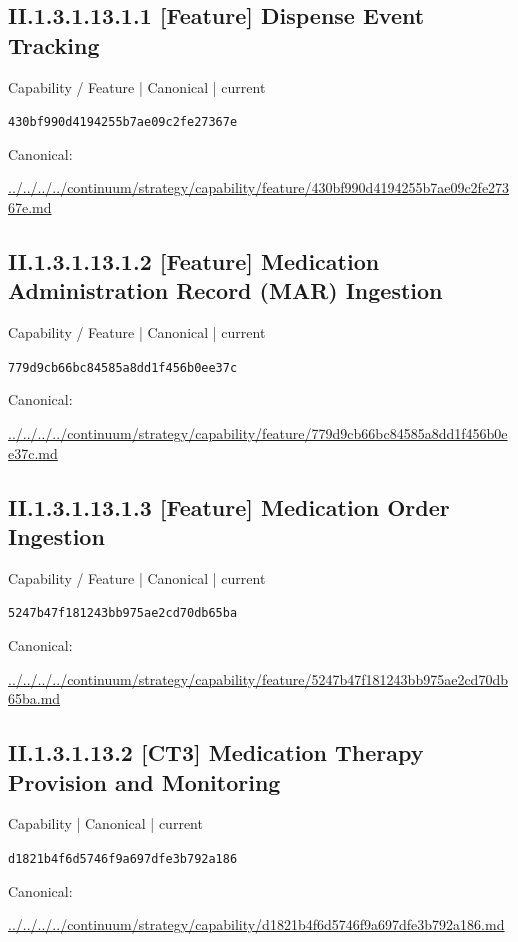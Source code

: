 \documentclass[10pt,a4paper]{article}
\begin{document}
\subsection*{II.1.3.1.13.1.1 [Feature] Dispense Event Tracking}
\label{element-430bf990d4194255b7ae09c2fe27367e}
{\small Capability / Feature | Canonical | current}\par
\texttt{430bf990d4194255b7ae09c2fe27367e}\par
Canonical: \par
{\footnotesize\url{../../../../continuum/strategy/capability/feature/430bf990d4194255b7ae09c2fe27367e.md}}\par
\subsection*{II.1.3.1.13.1.2 [Feature] Medication Administration Record (MAR) Ingestion}
\label{element-779d9cb66bc84585a8dd1f456b0ee37c}
{\small Capability / Feature | Canonical | current}\par
\texttt{779d9cb66bc84585a8dd1f456b0ee37c}\par
Canonical: \par
{\footnotesize\url{../../../../continuum/strategy/capability/feature/779d9cb66bc84585a8dd1f456b0ee37c.md}}\par
\subsection*{II.1.3.1.13.1.3 [Feature] Medication Order Ingestion}
\label{element-5247b47f181243bb975ae2cd70db65ba}
{\small Capability / Feature | Canonical | current}\par
\texttt{5247b47f181243bb975ae2cd70db65ba}\par
Canonical: \par
{\footnotesize\url{../../../../continuum/strategy/capability/feature/5247b47f181243bb975ae2cd70db65ba.md}}\par
\subsection*{II.1.3.1.13.2 [CT3] Medication Therapy Provision and Monitoring}
\label{element-d1821b4f6d5746f9a697dfe3b792a186}
{\small Capability | Canonical | current}\par
\texttt{d1821b4f6d5746f9a697dfe3b792a186}\par
Canonical: \par
{\footnotesize\url{../../../../continuum/strategy/capability/d1821b4f6d5746f9a697dfe3b792a186.md}}\par
\end{document}
